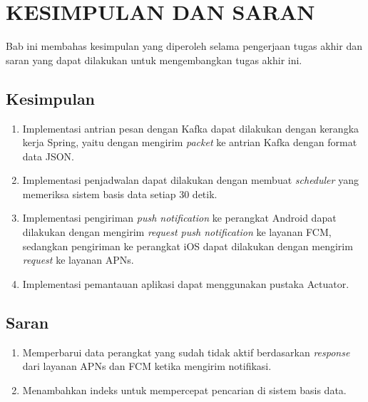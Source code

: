 \chapter{KESIMPULAN DAN SARAN}
\par Bab ini membahas kesimpulan yang diperoleh selama pengerjaan tugas akhir dan saran yang dapat dilakukan untuk mengembangkan tugas akhir ini.

\section{Kesimpulan}
\begin{enumerate}
	\item Implementasi antrian pesan dengan Kafka dapat dilakukan dengan kerangka kerja Spring, yaitu dengan mengirim \textit{packet} ke antrian Kafka dengan format data JSON.
	\item Implementasi penjadwalan dapat dilakukan dengan membuat \textit{scheduler} yang memeriksa sistem basis data setiap 30 detik.
	\item Implementasi pengiriman \textit{push notification} ke perangkat Android dapat dilakukan dengan mengirim \textit{request push notification} ke layanan FCM, sedangkan pengiriman ke perangkat iOS dapat dilakukan dengan mengirim \textit{request} ke layanan APNs.
	\item Implementasi pemantauan aplikasi dapat menggunakan pustaka Actuator.
\end{enumerate}

\section{Saran}
\begin{enumerate}
    \item Memperbarui data perangkat yang sudah tidak aktif berdasarkan \textit{response} dari layanan APNs dan FCM ketika mengirim notifikasi.
    \item Menambahkan indeks untuk mempercepat pencarian di sistem basis data.
\end{enumerate}
